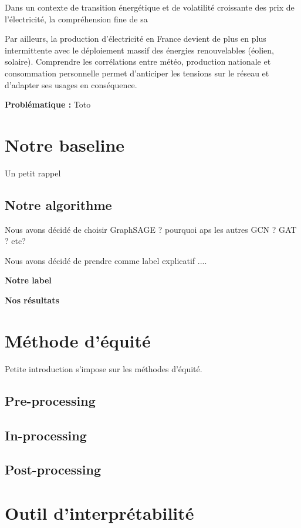 \documentclass[10pt,a4paper,twocolumn]{article}
\begin{document}
Dans un contexte de transition énergétique et de volatilité croissante des prix de l'électricité, la compréhension fine de sa 

\vspace*{0.2cm}
Par ailleurs, la production d'électricité en France devient de plus en plus intermittente avec le déploiement massif des énergies renouvelables (éolien, solaire). Comprendre les corrélations entre météo, production nationale et consommation personnelle permet d'anticiper les tensions sur le réseau et d'adapter ses usages en conséquence.

\vspace*{0.2cm}
\textbf{Problématique :} Toto
 

\section{Notre baseline}
Un petit rappel
\subsection{Notre algorithme}
Nous avons décidé de choisir GraphSAGE ? pourquoi aps les autres GCN ? GAT ? etc?  

Nous avons décidé de prendre comme label explicatif ....

\textbf{Notre label}

\textbf{Nos résultats}


\section{Méthode d'équité}
Petite introduction s'impose sur les méthodes d'équité.

\subsection{Pre-processing}

\subsection{In-processing}

\subsection{Post-processing}


\section{Outil d'interprétabilité}
\end{document}
